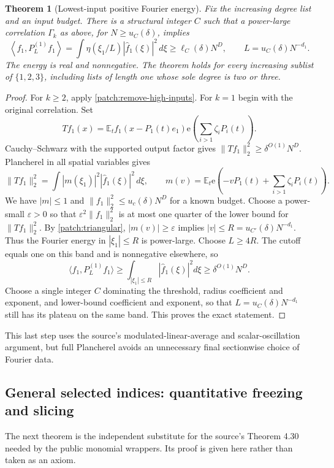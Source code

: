 \documentclass[11pt]{article}
\newtheorem{theorem}{Theorem}[section]
\theoremstyle{definition}
\newcommand{\ee}[1]{\mathrm e\!\left(#1\right)}
\begin{document}
\begin{theorem}[Lowest-input positive Fourier energy]\label{patch:lowest-energy}
Fix the increasing degree list and an input budget.  There is a structural integer $C$ such
that a power-large correlation $\Gamma_k$ as above, for $N\geq u_C(\delta)$, implies
\[
 \left\langle f_1,P_{L}^{(1)}f_1\right\rangle
       =\int\eta(\xi_1/L)|\widehat f_1(\xi)|^2\,d\xi
       \geq\ell_C(\delta)N^D,
       \qquad L=u_C(\delta)N^{-d_1}.
\]
The energy is real and nonnegative.  The theorem holds for every increasing sublist of
$\{1,2,3\}$, including lists of length one whose sole degree is two or three.
\end{theorem}
\begin{proof}
For $k\geq2$, apply \cref{patch:remove-high-inputs}.  For $k=1$ begin with the original
correlation.  Set
\[
 T f_1(x)=\mathbb E_t f_1(x-P_1(t)e_1)\ee{\sum_{i>1}\zeta_iP_i(t)}.
\]
Cauchy--Schwarz with the supported output factor gives
$\|Tf_1\|_2^2\geq\delta^{O(1)}N^D$.
Plancherel in all spatial variables gives
\[
 \|Tf_1\|_2^2=\int |m(\xi_1)|^2|\widehat f_1(\xi)|^2\,d\xi,
 \qquad m(v)=\mathbb E_t\ee{-vP_1(t)+\sum_{i>1}\zeta_iP_i(t)}.
\]
We have $|m|\leq1$ and $\|f_1\|_2^2\leq u_c(\delta)N^D$ for a known budget.
Choose a power-small $\varepsilon>0$ so that
$\varepsilon^2\|f_1\|_2^2$ is at most one quarter of the lower bound for $\|Tf_1\|_2^2$.
By \cref{patch:triangular}, $|m(v)|\geq\varepsilon$ implies
$|v|\leq R=u_{C'}(\delta)N^{-d_1}$.
Thus the Fourier energy in $|\xi_1|\leq R$ is power-large.
Choose $L\geq4R$.  The cutoff equals one on this band and is nonnegative elsewhere, so
\[
 \langle f_1,P_L^{(1)}f_1\rangle\geq
          \int_{|\xi_1|\leq R}|\widehat f_1(\xi)|^2d\xi
                              \geq\delta^{O(1)}N^D.
\]
Choose a single integer $C$ dominating the threshold, radius coefficient and exponent,
and lower-bound coefficient and exponent, so that $L=u_C(\delta)N^{-d_1}$ still has its
plateau on the same band.  This proves the exact statement.
\end{proof}
This last step uses the source's modulated-linear-average and scalar-oscillation argument,
but full Plancherel avoids an unnecessary final sectionwise choice of Fourier data.

\subsection{General selected indices: quantitative freezing and slicing}
\label{patch:all-indices}
The next theorem is the independent substitute for the source's Theorem 4.30 needed by the
public monomial wrappers.  Its proof is given here rather than taken as an axiom.
\end{document}
